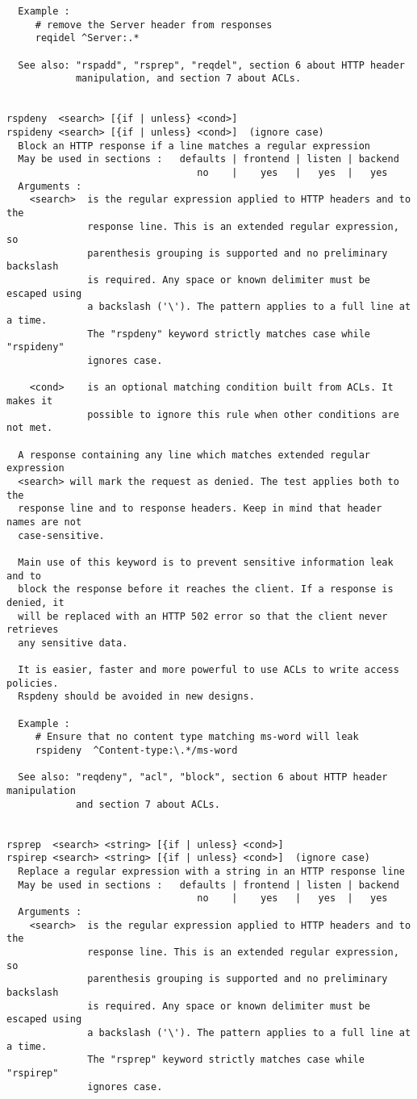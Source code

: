 \begin{verbatim}
  Example :
     # remove the Server header from responses
     reqidel ^Server:.*

  See also: "rspadd", "rsprep", "reqdel", section 6 about HTTP header
            manipulation, and section 7 about ACLs.


rspdeny  <search> [{if | unless} <cond>]
rspideny <search> [{if | unless} <cond>]  (ignore case)
  Block an HTTP response if a line matches a regular expression
  May be used in sections :   defaults | frontend | listen | backend
                                 no    |    yes   |   yes  |   yes
  Arguments :
    <search>  is the regular expression applied to HTTP headers and to the
              response line. This is an extended regular expression, so
              parenthesis grouping is supported and no preliminary backslash
              is required. Any space or known delimiter must be escaped using
              a backslash ('\'). The pattern applies to a full line at a time.
              The "rspdeny" keyword strictly matches case while "rspideny"
              ignores case.

    <cond>    is an optional matching condition built from ACLs. It makes it
              possible to ignore this rule when other conditions are not met.

  A response containing any line which matches extended regular expression
  <search> will mark the request as denied. The test applies both to the
  response line and to response headers. Keep in mind that header names are not
  case-sensitive.

  Main use of this keyword is to prevent sensitive information leak and to
  block the response before it reaches the client. If a response is denied, it
  will be replaced with an HTTP 502 error so that the client never retrieves
  any sensitive data.

  It is easier, faster and more powerful to use ACLs to write access policies.
  Rspdeny should be avoided in new designs.

  Example :
     # Ensure that no content type matching ms-word will leak
     rspideny  ^Content-type:\.*/ms-word

  See also: "reqdeny", "acl", "block", section 6 about HTTP header manipulation
            and section 7 about ACLs.


rsprep  <search> <string> [{if | unless} <cond>]
rspirep <search> <string> [{if | unless} <cond>]  (ignore case)
  Replace a regular expression with a string in an HTTP response line
  May be used in sections :   defaults | frontend | listen | backend
                                 no    |    yes   |   yes  |   yes
  Arguments :
    <search>  is the regular expression applied to HTTP headers and to the
              response line. This is an extended regular expression, so
              parenthesis grouping is supported and no preliminary backslash
              is required. Any space or known delimiter must be escaped using
              a backslash ('\'). The pattern applies to a full line at a time.
              The "rsprep" keyword strictly matches case while "rspirep"
              ignores case.


\end{verbatim}
